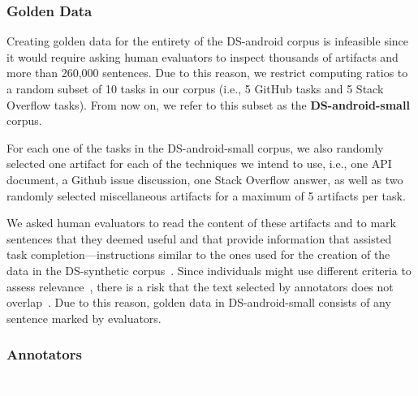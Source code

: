 




\subsubsection{Golden Data}


Creating golden data for the entirety of the \acs{DS-android} corpus is infeasible
since it would require asking human evaluators to inspect thousands of artifacts and more than 260,000 sentences.
Due to this reason, we restrict computing ratios to a random subset of 10 tasks in our corpus (i.e., 5 GitHub tasks and 5 Stack Overflow tasks). 
From now on, we refer to this subset as the \textbf{\acs{DS-android-small}} corpus.


For each one of the tasks in the \acs{DS-android-small} corpus, we also randomly selected 
one artifact for each of the techniques we intend to use, i.e., one API document, a Github issue discussion, one Stack Overflow answer, as well as two randomly selected miscellaneous artifacts for a maximum of 5 artifacts per task.



We asked human evaluators to read the content of these artifacts and 
to mark sentences that they deemed useful and that provide information that assisted task completion---instructions similar to the ones used for the creation of the 
data in the \acs{DS-synthetic} corpus~\cite{marques2020}.
Since individuals might use different criteria to
assess relevance~\cite{Barry1994, Barry1998, Freund2015},
there is a risk that
the text selected by annotators does not overlap~\cite{Freund2013, Freund2015}.
Due to this reason, golden data in \acs{DS-android-small} consists of any sentence marked by evaluators. 






\subsubsection{Annotators}
\textcolor{white}{force ident} %


